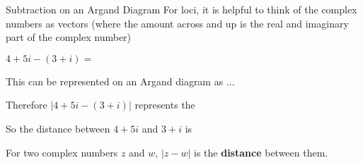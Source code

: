 \documentclass[8pt]{beamer}
\begin{document}
\begin{frame}[shrink=10]{Subtraction on an Argand Diagram}
	\alert{For loci, it is helpful to think of the complex numbers
as vectors (where the amount across and up is the real
and imaginary part of the complex number)}



	\begin{center}
\end{center}


	$4+5i-(3+i)=$ 


This can be represented on an Argand diagram as ...


Therefore  $|4+5i-(3+i)|$ represents the 

So the distance between  $4+5i$ and  $3+i$ is 

\begin{definition}
	For two complex numbers $z$ and  $w$,  $|z-w|$ is the \textbf{distance}  between them.
\end{definition}
\end{frame}
\end{document}
